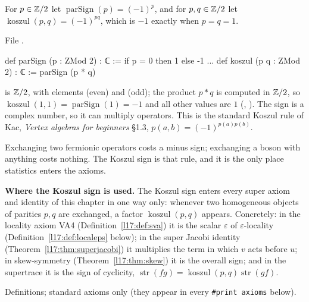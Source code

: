 \begin{definition}\label{l17:def:koszul}
For $p\in{\mathbb{Z}}/2$ let $\operatorname{parSign}(p)=(-1)^p$, and for $p,q\in{\mathbb{Z}}/2$ let
$\operatorname{koszul}(p,q)=(-1)^{pq}$, which is $-1$ exactly when $p=q=1$.
\end{definition}
\noindent File .
\begin{leancode}
def parSign (p : ZMod 2) : ℂ := if p = 0 then 1 else -1
...
def koszul (p q : ZMod 2) : ℂ := parSign (p * q)
\end{leancode}
\begin{dictionary}
 is ${\mathbb{Z}}/2$, with elements  (even) and  (odd); the product $p*q$ is
computed in ${\mathbb{Z}}/2$, so $\operatorname{koszul}(1,1)=\operatorname{parSign}(1)=-1$ and all other values
are $1$ (, ). The sign is a complex number, so it can
multiply operators. This is the standard Koszul rule of Kac, \emph{Vertex algebras for beginners}
§1.3, $p(a,b)=(-1)^{p(a)p(b)}$.
\end{dictionary}
\begin{physics}
Exchanging two fermionic operators costs a minus sign; exchanging a boson with anything costs
nothing. The Koszul sign is that rule, and it is the only place statistics enters the axioms.
\end{physics}
\noindent\textbf{Where the Koszul sign is used.} The Koszul sign enters every super axiom and
identity of this chapter in one way only: whenever two homogeneous objects of parities $p,q$ are
exchanged, a factor $\operatorname{koszul}(p,q)$ appears. Concretely: in the locality axiom VA4
(Definition~\ref{l17:def:sva}) it is the scalar $\varepsilon$ of $\varepsilon$-locality
(Definition~\ref{l17:def:localeps} below); in the super Jacobi identity
(Theorem~\ref{l17:thm:superjacobi}) it multiplies the term in which $v$ acts before $u$; in
skew-symmetry (Theorem~\ref{l17:thm:skew}) it is the overall sign; and in the supertrace it is the
sign of cyclicity, $\operatorname{str}(fg)=\operatorname{koszul}(p,q)\operatorname{str}(gf)$.
\begin{status}
Definitions; standard axioms only (they appear in every \texttt{\#print axioms} below).
\end{status}

